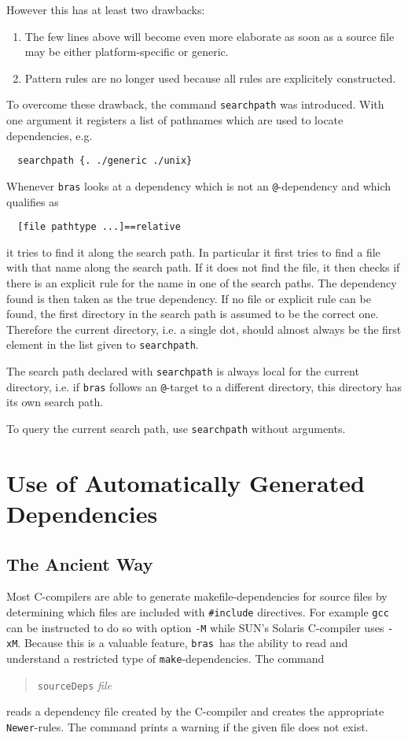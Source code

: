 \documentclass[12pt]{article}
\newcommand{\bras}{\texttt{bras}}
\newcommand{\make}{\texttt{make}}
\begin{document}
However this has at least two drawbacks:
\begin{enumerate}
\item The few lines above will become even more elaborate as soon as a
  source file may be either platform-specific or generic.
\item Pattern rules are no longer used because all rules are
  explicitely constructed.
\end{enumerate}

To overcome these drawback, the command \texttt{searchpath} was
introduced. With one argument it registers a list of pathnames which are
used to locate dependencies, e.g.
\begin{verbatim}
  searchpath {. ./generic ./unix}
\end{verbatim}
Whenever \bras{} looks at a dependency which is not an
\texttt{@}-dependency and which qualifies as
\begin{verbatim}
  [file pathtype ...]==relative
\end{verbatim}
it tries to find it along the search path. In particular it first
tries to find a file with that name along the search path. If it does
not find the file, it then
checks if there is an explicit rule for the name in one of the search
paths. The dependency found is then taken as the true dependency. If
no file or explicit rule can be found, the first directory in the
search path is assumed to be the correct one. Therefore the current
directory, i.e. a single dot, should almost always be the first
element in the list given to \texttt{searchpath}.

The search path declared with \texttt{searchpath} is always local for
the current directory, i.e. if \bras{} follows an \texttt{@}-target to
a different directory, this directory has its own search path.

To query the current search path, use \texttt{searchpath} without
arguments. 

\section{Use of Automatically Generated Dependencies}

\subsection{The Ancient Way}
Most C-compilers are able to generate makefile-dependencies for
source files by determining which files are included with
\texttt{\#include} directives. For example \texttt{gcc} can be
instructed to do so with option \texttt{-M} while SUN's Solaris
C-compiler uses \texttt{-xM}. Because this is a valuable feature,
\bras\ has the ability to read and understand a restricted type of
\make-dependencies. The command
\begin{quote}
  \texttt{sourceDeps} \textit{file}
\end{quote}
reads a dependency file created by the C-compiler and creates the
appropriate \texttt{Newer}-rules. The command prints a warning if
the given file does not exist.
\end{document}
